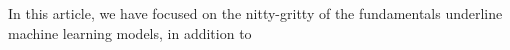 In this article, we have focused on the nitty-gritty of the fundamentals underline machine learning models, in addition to 